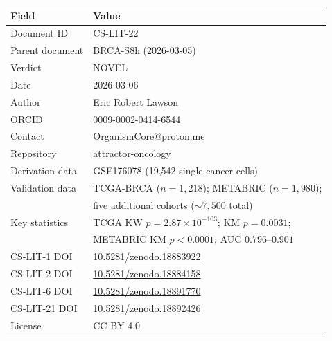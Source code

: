 \documentclass[12pt, a4paper]{article}
\begin{document}
\begin{tabular}{ll}
\toprule
\textbf{Field} & \textbf{Value} \\
\midrule
Document ID & CS-LIT-22 \\
Parent document & BRCA-S8h (2026-03-05) \\
Verdict & NOVEL \\
Date & 2026-03-06 \\
Author & Eric Robert Lawson \\
ORCID & 0009-0002-0414-6544 \\
Contact & OrganismCore@proton.me \\
Repository &
\href{https://github.com/Eric-Robert-Lawson/attractor-oncology}
{attractor-oncology} \\
Derivation data &
GSE176078 (19,542 single cancer cells) \\
Validation data &
TCGA-BRCA ($n=1{,}218$);
METABRIC ($n=1{,}980$); \\
& five additional cohorts
(${\sim}7{,}500$ total) \\
Key statistics &
TCGA KW $p=2.87\times10^{-103}$;
KM $p=0.0031$; \\
& METABRIC KM $p<0.0001$;
AUC $0.796$--$0.901$ \\
CS-LIT-1 DOI &
\href{https://doi.org/10.5281/zenodo.18883922}
{10.5281/zenodo.18883922} \\
CS-LIT-2 DOI &
\href{https://doi.org/10.5281/zenodo.18884158}
{10.5281/zenodo.18884158} \\
CS-LIT-6 DOI &
\href{https://doi.org/10.5281/zenodo.18891770}
{10.5281/zenodo.18891770} \\
CS-LIT-21 DOI &
\href{https://doi.org/10.5281/zenodo.18892426}
{10.5281/zenodo.18892426} \\
License & CC BY 4.0 \\
\bottomrule
\end{tabular}
\end{document}
